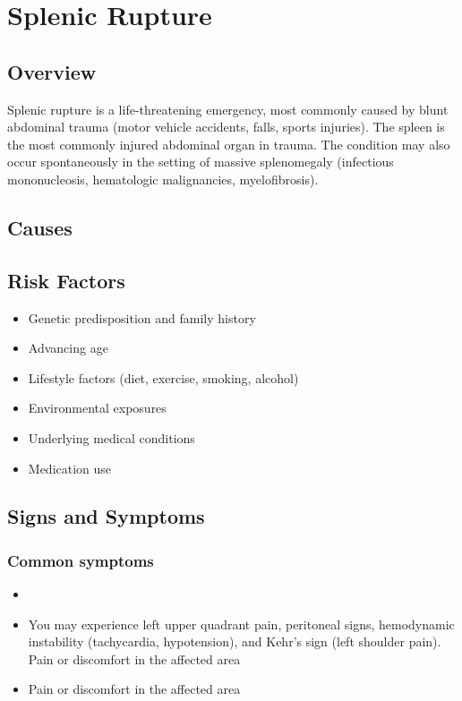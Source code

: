 \chapter{Splenic Rupture}
\label{sec:Splenic Rupture}

\section{Overview}
Splenic rupture is a life-threatening emergency, most commonly caused by blunt abdominal trauma (motor vehicle accidents, falls, sports injuries). The spleen is the most commonly injured abdominal organ in trauma. The condition may also occur spontaneously in the setting of massive splenomegaly (infectious mononucleosis, hematologic malignancies, myelofibrosis).
\section{Causes}
\section{Risk Factors}

\begin{itemize}[noitemsep]
  \item Genetic predisposition and family history
  \item Advancing age
  \item Lifestyle factors (diet, exercise, smoking, alcohol)
  \item Environmental exposures
  \item Underlying medical conditions
  \item Medication use
\end{itemize}
\section{Signs and Symptoms}

\subsection{Common symptoms}
\begin{itemize}[noitemsep]
  \item \item You may experience left upper quadrant pain, peritoneal signs, hemodynamic instability (tachycardia, hypotension), and Kehr's sign (left shoulder pain). Pain or discomfort in the affected area    \item Pain or discomfort in the affected area
  \end{itemize}

